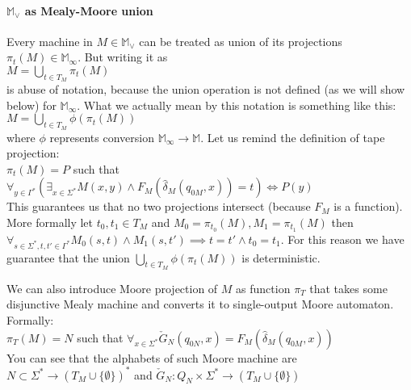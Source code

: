 \documentclass[12pt]{article}
\begin{document}
 \paragraph{$\mathbb{M}_\vee$ as Mealy-Moore union}
 Every machine in $M\in\mathbb{M}_\vee$ can be treated as union  of its projections $\pi_t(M) \in \mathbb{M}_\infty$. But writing it as \\
 $M = \bigcup_{t\in T_M} \pi_t(M)$ \\
 is abuse of notation, because the union operation is not defined (as we will show below) for $\mathbb{M}_\infty$. What we actually mean by this notation is something like this: \\
 $M = \bigcup_{t\in T_M} \phi(\pi_t(M))$ \\
 where $\phi$ represents conversion $\mathbb{M}_\infty \rightarrow \mathbb{M}$. Let us remind the definition of tape projection: \\
 $\pi_t(M) = P$ such that $\forall_{y\in\Gamma^*} (\exists_{x\in\Sigma^*} M(x,y) \wedge F_M(\hat{\delta}_M(q_{0M},x))=t) \iff P(y)$ \\
 This guarantees us that no two projections intersect (because $F_M$ is a function). More formally let $t_0, t_1 \in T_M$ and $M_0 = \pi_{t_0}(M), M_1=\pi_{t_1}(M)$ then $\forall_{s\in\Sigma^*,t,t'\in\Gamma^*} M_0(s,t) \wedge M_1(s,t') \implies t=t' \wedge t_0 = t_1$. For this reason we have guarantee that the union $ \bigcup_{t\in T_M} \phi(\pi_t(M))$ is deterministic.
 
 We can also introduce Moore projection of $M$ as function $\pi_T $ that takes some disjunctive Mealy machine and converts it to single-output Moore automaton. Formally: \\
 $\pi_T(M) = N$ such that $\forall_{x\in\Sigma^*} \check{G}_N(q_{0N},x) = F_M(\hat{\delta}_M(q_{0M},x))$ \\
 You can see that the alphabets of such Moore machine are $N \subset \Sigma^* \rightarrow (T_M \cup \{\emptyset\})^*$ and $\check{G}_N : Q_N \times \Sigma^* \rightarrow (T_M \cup \{\emptyset\})$
 
\end{document}
